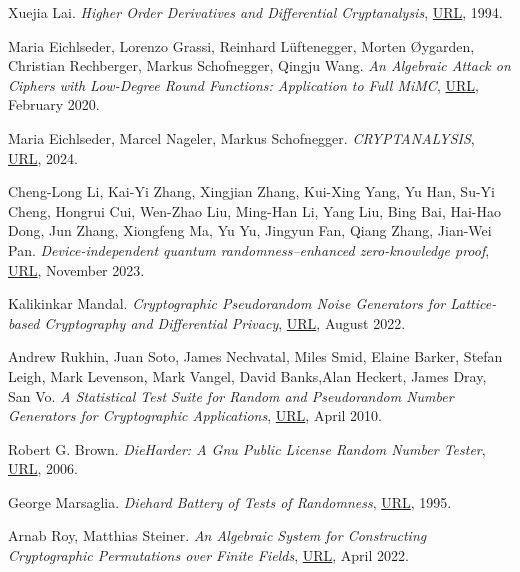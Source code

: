 \documentclass{Resources/UoBLab1}
\theoremstyle{definition}
\begin{document}
\begin{thebibliography}{10}
 Xuejia Lai. \textit{Higher Order Derivatives and Differential Cryptanalysis}, \href{https://link.springer.com/chapter/10.1007/978-1-4615-2694-0_23}{URL}, 1994.

 Maria Eichlseder, Lorenzo Grassi, Reinhard Lüftenegger, Morten Øygarden, Christian Rechberger, Markus Schofnegger, Qingju Wang. \textit{An Algebraic Attack on Ciphers with Low-Degree Round Functions: Application to Full MiMC}, \href{https://eprint.iacr.org/2020/182.pdf}{URL}, February 2020.

 Maria Eichlseder, Marcel Nageler, Markus Schofnegger. \textit{CRYPTANALYSIS}, \href{https://www.iaik.tugraz.at/course/cryptanalysis-705068-sommersemester-2024}{URL}, 2024.

 Cheng-Long Li, Kai-Yi Zhang, Xingjian Zhang, Kui-Xing Yang, Yu Han, Su-Yi Cheng, Hongrui Cui, Wen-Zhao Liu, Ming-Han Li, Yang Liu, Bing Bai, Hai-Hao Dong, Jun Zhang, Xiongfeng Ma, Yu Yu, Jingyun Fan, Qiang Zhang, Jian-Wei Pan. \textit{Device-independent quantum randomness–enhanced zero-knowledge proof}, \href{https://doi.org/10.1073/pnas.2205463120}{URL}, November 2023.

 Kalikinkar Mandal. \textit{Cryptographic Pseudorandom Noise Generators for Lattice-based Cryptography and Differential Privacy}, \href{https://ieeexplore.ieee.org/abstract/document/9870587/}{URL}, August 2022.

 Andrew Rukhin, Juan Soto, James Nechvatal, Miles Smid, Elaine Barker, Stefan Leigh, Mark Levenson, Mark Vangel, David Banks,Alan Heckert, James Dray, San Vo. \textit{A Statistical Test Suite for Random and Pseudorandom Number Generators for Cryptographic Applications}, \href{https://csrc.nist.gov/pubs/sp/800/22/r1/upd1/final}{URL}, April 2010.

 Robert G. Brown. \textit{DieHarder: A Gnu Public License Random Number Tester}, \href{https://rurban.github.io/dieharder/manual/dieharder.pdf}{URL}, 2006.

 George Marsaglia. \textit{Diehard Battery of Tests of Randomness}, \href{https://web.archive.org/web/20160125103112/http://stat.fsu.edu/pub/diehard/}{URL}, 1995.

 Arnab Roy, Matthias Steiner. \textit{An Algebraic System for Constructing Cryptographic Permutations over Finite Fields}, \href{https://arxiv.org/pdf/2204.01802v1.pdf}{URL}, April 2022.


\end{thebibliography}
\end{document}
